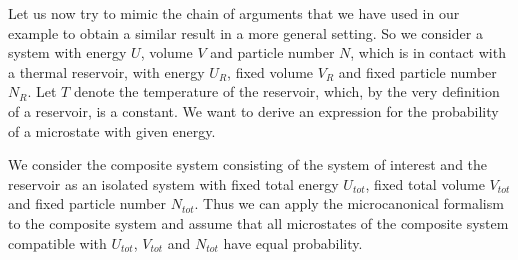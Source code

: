 \documentclass[a4paper, draft]{article}
\theoremstyle{own}
\theoremstyle{remark}
\begin{document}
Let us now try to mimic the chain of arguments that we have used in our example to obtain a similar result in a more general setting. So we consider a system with energy $U$, volume $V$ and particle number $N$, which is in contact with a thermal reservoir, with energy $U_R$, fixed volume $V_R$ and fixed particle number $N_R$. Let $T$ denote the temperature of the reservoir, which, by the very definition of a reservoir, is a constant. We want to derive an expression for the probability of a microstate with given energy.

We consider the composite system consisting of the system of interest and the reservoir as an isolated system with fixed total energy $U_{tot}$, fixed total volume $V_{tot}$ and fixed particle number $N_{tot}$. Thus we can apply the microcanonical formalism to the composite system and assume that all microstates of the composite system compatible with $U_{tot}$, $V_{tot}$ and $N_{tot}$ have equal probability.  
\end{document}

